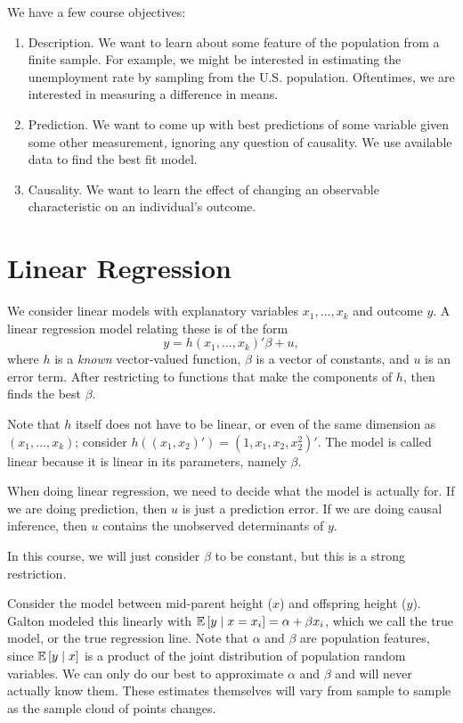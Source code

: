 
We have a few course objectives:
\begin{enumerate}[label=(\roman*)]
	\item Description. We want to learn about some feature of the population from a finite sample. For example, we might be interested in estimating the unemployment rate by sampling from the U.S. population. Oftentimes, we are interested in measuring a difference in means.
	\item Prediction. We want to come up with best predictions of some variable given some other measurement, ignoring any question of causality. We use available data to find the best fit model.
	\item Causality. We want to learn the effect of changing an observable characteristic on an individual's outcome.
\end{enumerate}

\section{Linear Regression}

We consider linear models with explanatory variables $x_1,\ldots,x_k$ and outcome $y$. A linear regression model relating these is of the form \[
	y = h(x_1,\ldots,x_k)' \beta + u
	,\] where $h$ is a \emph{known} vector-valued function, $\beta$ is a vector of constants, and $u$ is an error term. After restricting to functions that make the components of $h$, then finds the best $\beta$.

Note that $h$ itself does not have to be linear, or even of the same dimension as $(x_1,\ldots,x_k)$; consider $h((x_1,x_2)') = (1,x_1, x_2, x_2^2)'$. The model is called linear because it is linear in its parameters, namely $\beta$.

When doing linear regression, we need to decide what the model is actually for. If we are doing prediction, then $u$ is just a prediction error. If we are doing causal inference, then $u$ contains the unobserved determinants of $y$.

In this course, we will just consider $\beta$ to be constant, but this is a strong restriction.

Consider the model between mid-parent height ($x$) and offspring height ($y$). Galton modeled this linearly with $\mathbb{E}\left[y \mid x = x_i\right] = \alpha + \beta x_i$, which we call the true model, or the true regression line.
Note that $\alpha$ and $\beta$ are population features, since $\mathbb{E}\left[y \mid x\right]$ is a product of the joint distribution of population random variables. We can only do our best to approximate $\alpha$ and $\beta$ and will never actually know them. These estimates themselves will vary from sample to sample as the sample cloud of points changes.


